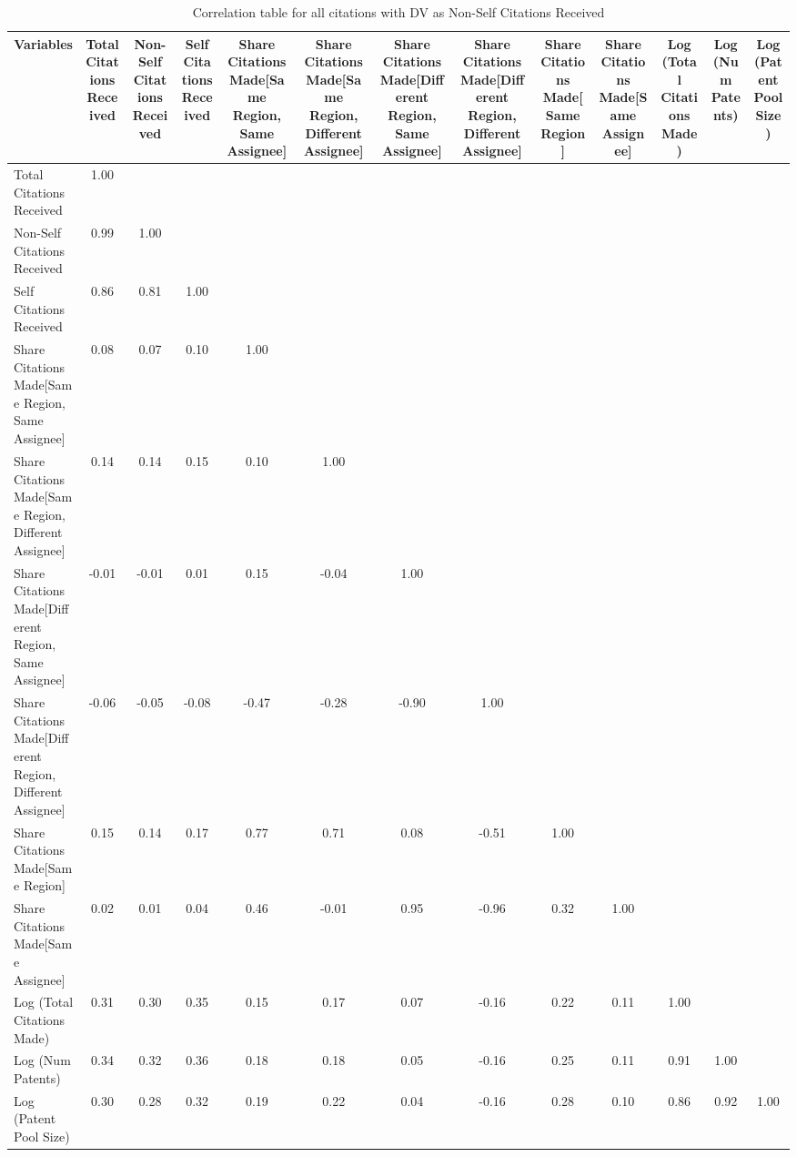 \begin{table}[htbp]\centering \caption{Correlation table for all citations  with DV as Non-Self Citations Received\label{a.e.o.t.n.ncorrelation}}
\begin{tabular}{l  c  c  c  c  c  c  c  c  c  c  c  c }\hline\hline
\multicolumn{1}{c}{Variables} &Total Citations Received&Non-Self Citations Received&Self Citations Received&Share Citations Made[Same Region, Same Assignee]&Share Citations Made[Same Region, Different Assignee]&Share Citations Made[Different Region, Same Assignee]&Share Citations Made[Different Region, Different Assignee]&Share Citations Made[Same Region]&Share Citations Made[Same Assignee]&Log (Total Citations Made)&Log (Num Patents)&Log (Patent Pool Size)\\ \hline
Total Citations Received&1.00\\
Non-Self Citations Received&0.99&1.00\\
Self Citations Received&0.86&0.81&1.00\\
Share Citations Made[Same Region, Same Assignee]&0.08&0.07&0.10&1.00\\
Share Citations Made[Same Region, Different Assignee]&0.14&0.14&0.15&0.10&1.00\\
Share Citations Made[Different Region, Same Assignee]&-0.01&-0.01&0.01&0.15&-0.04&1.00\\
Share Citations Made[Different Region, Different Assignee]&-0.06&-0.05&-0.08&-0.47&-0.28&-0.90&1.00\\
Share Citations Made[Same Region]&0.15&0.14&0.17&0.77&0.71&0.08&-0.51&1.00\\
Share Citations Made[Same Assignee]&0.02&0.01&0.04&0.46&-0.01&0.95&-0.96&0.32&1.00\\
Log (Total Citations Made)&0.31&0.30&0.35&0.15&0.17&0.07&-0.16&0.22&0.11&1.00\\
Log (Num Patents)&0.34&0.32&0.36&0.18&0.18&0.05&-0.16&0.25&0.11&0.91&1.00\\
Log (Patent Pool Size)&0.30&0.28&0.32&0.19&0.22&0.04&-0.16&0.28&0.10&0.86&0.92&1.00\\
\hline \hline 
 \end{tabular}
\end{table}
